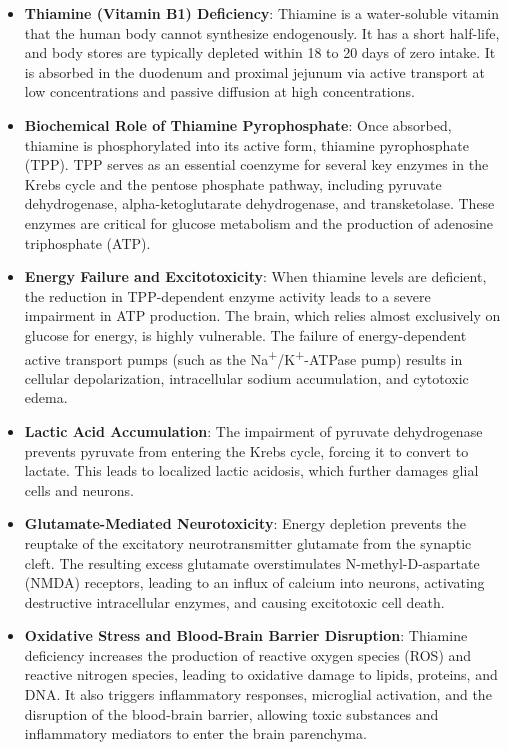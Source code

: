 \begin{itemize}
    \item \textbf{Thiamine (Vitamin B1) Deficiency}: Thiamine is a water-soluble vitamin that the human body cannot synthesize endogenously. It has a short half-life, and body stores are typically depleted within 18 to 20 days of zero intake. It is absorbed in the duodenum and proximal jejunum via active transport at low concentrations and passive diffusion at high concentrations.
    \item \textbf{Biochemical Role of Thiamine Pyrophosphate}: Once absorbed, thiamine is phosphorylated into its active form, thiamine pyrophosphate (TPP). TPP serves as an essential coenzyme for several key enzymes in the Krebs cycle and the pentose phosphate pathway, including pyruvate dehydrogenase, alpha-ketoglutarate dehydrogenase, and transketolase. These enzymes are critical for glucose metabolism and the production of adenosine triphosphate (ATP).
    \item \textbf{Energy Failure and Excitotoxicity}: When thiamine levels are deficient, the reduction in TPP-dependent enzyme activity leads to a severe impairment in ATP production. The brain, which relies almost exclusively on glucose for energy, is highly vulnerable. The failure of energy-dependent active transport pumps (such as the Na\textsuperscript{+}/K\textsuperscript{+}-ATPase pump) results in cellular depolarization, intracellular sodium accumulation, and cytotoxic edema.
    \item \textbf{Lactic Acid Accumulation}: The impairment of pyruvate dehydrogenase prevents pyruvate from entering the Krebs cycle, forcing it to convert to lactate. This leads to localized lactic acidosis, which further damages glial cells and neurons.
    \item \textbf{Glutamate-Mediated Neurotoxicity}: Energy depletion prevents the reuptake of the excitatory neurotransmitter glutamate from the synaptic cleft. The resulting excess glutamate overstimulates N-methyl-D-aspartate (NMDA) receptors, leading to an influx of calcium into neurons, activating destructive intracellular enzymes, and causing excitotoxic cell death.
    \item \textbf{Oxidative Stress and Blood-Brain Barrier Disruption}: Thiamine deficiency increases the production of reactive oxygen species (ROS) and reactive nitrogen species, leading to oxidative damage to lipids, proteins, and DNA. It also triggers inflammatory responses, microglial activation, and the disruption of the blood-brain barrier, allowing toxic substances and inflammatory mediators to enter the brain parenchyma.

\end{itemize}
